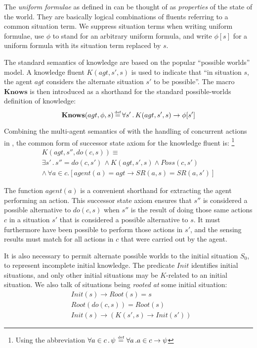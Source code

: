 \documentclass{ifaamas-submission}
\newcommand{\isdef}{\hbox{$\stackrel{\mbox{\tiny def}}{=}$}}
\begin{document}
The \emph{uniform formulae} as defined in \cite{pirri99contributions_sitcalc}
can be thought of as \emph{properties} of the state of the world.
They are basically logical combinations of fluents referring to a
common situation term. We suppress situation terms when writing
uniform formulae, use $\phi$ to stand for an arbitrary uniform
formula, and  write $\phi[s]$ for a uniform formula with its situation
term replaced by $s$.

The standard semantics of knowledge \cite{scherl03sc_knowledge} are
based on the popular {}``possible worlds'' model. A knowledge fluent
$K(agt,s',s)$ is used to indicate that {}``in situation $s$, the
agent $agt$ considers the alternate situation $s'$ to be possible''.
The macro $\mathbf{Knows}$ is then introduced as a shorthand for
the standard possible-worlds definition of knowledge:
\begin{equation}
\mathbf{Knows}(agt,\phi,s)\,\isdef\,\forall s'\,.\, K(agt,s',s)\rightarrow\phi[s']\label{eqn:knows_def}\end{equation}

Combining the multi-agent semantics of \cite{shapiro01casl_feat_inter}
with the handling of concurrent actions in \cite{scherl03conc_knowledge},
the common form of successor state axiom for the knowledge fluent
is:%
\footnote{Using the abbreviation $\forall a\in c\,.\,\psi\,\,\isdef\,\,\forall a\,.a\in c\rightarrow\psi$%
} \begin{multline}
K(agt,s'',do(c,s))\equiv\\
\exists s'\,.\, s''=do(c,s')\,\wedge K(agt,s',s)\wedge Poss(c,s')\\
\wedge\,\forall a\in c.\left[agent(a)=agt\rightarrow SR(a,s)=SR(a,s')\right]\label{eqn:k_ssa_standard}\end{multline}
 

The function $agent(a)$ is a convenient shorthand for extracting
the agent performing an action. This successor state axiom ensures
that $s''$ is considered a possible alternative to $do(c,s)$ when
$s''$ is the result of doing those same actions $c$ in a situation
$s'$ that is considered a possible alternative to $s$. It must furthermore
have been possible to perform those actions in $s'$, and the sensing
results must match for all actions in $c$ that were carried out by
the agent.

It is also necessary to permit alternate possible worlds to the initial
situation $S_{0}$, to represent incomplete initial knowledge. The
predicate $Init$ identifies initial situations, and only other initial
situations may be $K$-related to an initial situation. We also talk
of situations being \emph{rooted at} some initial situation: \begin{equation}
\begin{split} & Init(s)\rightarrow Root(s)=s\\
 & Root(do(c,s))=Root(s)\\
 & Init(s)\rightarrow\left(K(s',s)\rightarrow Init(s')\right)\end{split}
\label{eq:k_s0_standard}\end{equation}
\end{document}
